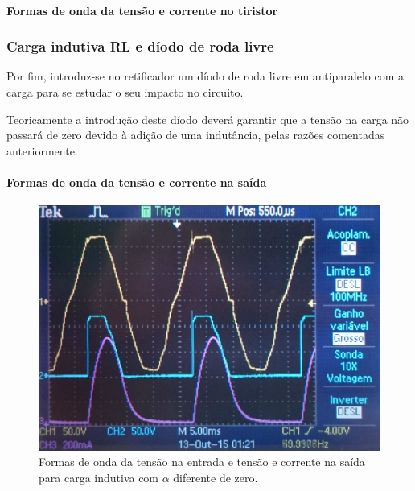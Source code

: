 \documentclass[a4paper,11pt]{article}
\numberwithin{equation}{section}
\begin{document}
\paragraph{Formas de onda da tensão e corrente no tiristor}



\subsubsection{Carga indutiva RL e díodo de roda livre}

Por fim, introduz-se no retificador um díodo de roda livre em antiparalelo com a carga para se estudar o seu impacto no circuito.

Teoricamente a introdução deste díodo deverá garantir que a tensão na carga não passará de zero devido à adição de uma indutância, pelas razões comentadas anteriormente.


\paragraph{Formas de onda da tensão e corrente na saída}

\begin{figure}[h]
	\centering
	\includegraphics[keepaspectratio=true, scale=0.11]{img/figs/bobine_alfa_dif_zero}
	\caption{Formas de onda da tensão na entrada e tensão e corrente na saída para carga indutiva com $\alpha$ diferente de zero.}
	\label{fig:bobine_alfa_dif_zero}
	\vspace{-0.8em}
\end{figure}
\end{document}

